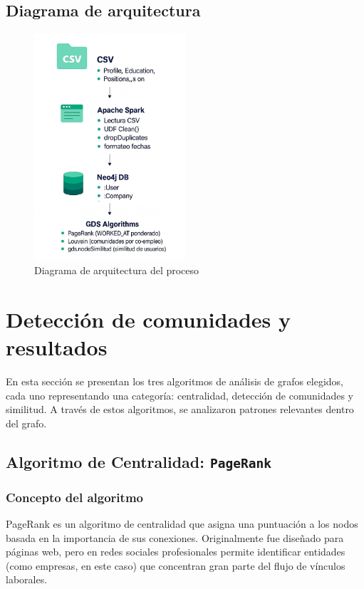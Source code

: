 \documentclass[10pt]{article}
\begin{document}
\subsection{Diagrama de arquitectura}
\begin{figure}[H]
	\centering
	\includegraphics[width=0.5\textwidth]{images/arch-diag.jpeg}
	\caption{Diagrama de arquitectura del proceso}
\end{figure}
\section{Detección de comunidades y resultados}

En esta sección se presentan los tres algoritmos de análisis de grafos elegidos, cada uno representando una categoría: centralidad, detección de comunidades y similitud. A través de estos algoritmos, se analizaron patrones relevantes dentro del grafo.

\subsection{Algoritmo de Centralidad: \texttt{PageRank}}

\subsubsection*{Concepto del algoritmo}
PageRank es un algoritmo de centralidad que asigna una puntuación a los nodos basada en la importancia de sus conexiones. Originalmente fue diseñado para páginas web, pero en redes sociales profesionales permite identificar entidades (como empresas, en este caso) que concentran gran parte del flujo de vínculos laborales.
\end{document}
